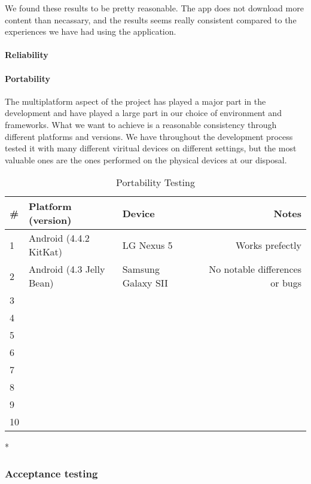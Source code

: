 We found these results to be pretty reasonable. The app does not download more content than necassary, and the results seems really consistent compared to the experiences we have had using the application.

\paragraph{Reliability}


\paragraph{Portability}

The multiplatform aspect of the project has played a major part in the development and have played a large part in our choice of environment and frameworks. What we want to achieve is a reasonable consistency through different platforms and versions. We have throughout the development process tested it with many different viritual devices on different settings, but the most valuable ones are the ones performed on the physical devices at our disposal.\\

\begin{table}[!htp]
\begin{center}
	\begin{tabular}{ | l | l | l | r | }
	\hline
	 \#	& Platform (version)	&Device			& Notes \\ \hline
	 1	&Android (4.4.2 KitKat)	&LG Nexus 5			& Works prefectly\\ \hline
	 2	&Android (4.3 Jelly Bean)	&Samsung Galaxy SII	& No notable differences or bugs\\ \hline
	 3&&&\\ \hline
	 4&&&\\ \hline
	 5&&&\\ \hline
	 6&&&\\ \hline
	 7&&&\\ \hline
	 8&&&\\ \hline
	 9&&&\\ \hline
	 10&&&\\ 
	 \hline
	 \end{tabular}
\end{center}
\caption{Portability Testing}
\label{tab:Portability Testing}
\end{table}


\/*

\subsubsection{Acceptance testing}



